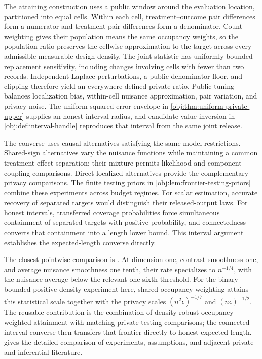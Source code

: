 \documentclass[11pt]{article}
\begin{document}
The attaining construction uses a public window around the evaluation location, partitioned into equal cells. Within each cell, treatment--outcome pair differences form a numerator and treatment pair differences form a denominator. Count weighting gives their population means the same occupancy weights, so the population ratio preserves the cellwise approximation to the target across every admissible measurable design density. The joint statistic has uniformly bounded replacement sensitivity, including changes involving cells with fewer than two records. Independent Laplace perturbations, a public denominator floor, and clipping therefore yield an everywhere-defined private ratio. Public tuning balances localization bias, within-cell nuisance approximation, pair variation, and privacy noise. The uniform squared-error envelope in \cref{obj:thm:uniform-private-upper} supplies an honest interval radius, and candidate-value inversion in \cref{obj:def:interval-handle} reproduces that interval from the same joint release.

The converse uses causal alternatives satisfying the same model restrictions. Shared-sign alternatives vary the nuisance functions while maintaining a common treatment-effect separation; their mixture permits likelihood and component-coupling comparisons. Direct localized alternatives provide the complementary privacy comparisons. The finite testing priors in \cref{obj:lem:frontier-testing-priors} combine these experiments across budget regimes. For scalar estimation, accurate recovery of separated targets would distinguish their released-output laws. For honest intervals, transferred coverage probabilities force simultaneous containment of separated targets with positive probability, and connectedness converts that containment into a length lower bound. This interval argument establishes the expected-length converse directly.

The closest pointwise comparison is \citet[][Theorems 1--2 and Remarks 2 and 11]{KennedyBalakrishnanRobinsWasserman2024}. At dimension one, contrast smoothness one, and average nuisance smoothness one tenth, their rate specializes to \(n^{-1/4}\), with the nuisance average below the relevant one-sixth threshold. For the binary bounded-positive-density experiment here, shared occupancy weighting attains this statistical scale together with the privacy scales \((n^2\epsilon)^{-1/7}\) and \((n\epsilon)^{-1/2}\). The reusable contribution is the combination of density-robust occupancy-weighted attainment with matching private testing comparisons; the connected-interval converse then transfers that frontier directly to honest expected length.  gives the detailed comparison of experiments, assumptions, and adjacent private and inferential literature.
\end{document}
